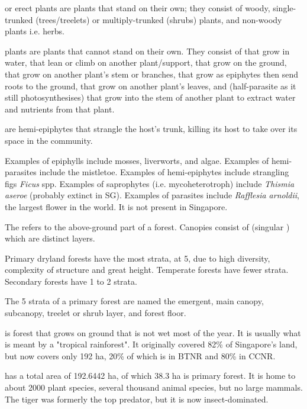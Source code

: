 \documentclass{slnotes}
\newcommand{\scn}[1]{\textit{#1}}
\begin{document}
 or erect plants are plants that stand on their own; they consist of woody, single-trunked (trees/treelets) or multiply-trunked (shrubs) plants, and non-woody plants i.e. herbs.

 plants are plants that cannot stand on their own. They consist of  that grow in water,  that lean or climb on another plant/support,  that grow on the ground,  that grow on another plant's stem or branches,  that grow as epiphytes then send roots to the ground,  that grow on another plant's leaves, and  (half-parasite as it still photosynthesises) that grow into the stem of another plant to extract water and nutrients from that plant.

 are hemi-epiphytes that strangle the host's trunk, killing its host to take over its space in the community.

Examples of epiphylls include mosses, liverworts, and algae. Examples of hemi-parasites include the mistletoe. Examples of hemi-epiphytes include strangling figs \scn{Ficus} spp. Examples of saprophytes (i.e. mycoheterotroph) include \scn{Thismia aseroe} (probably extinct in SG). Examples of parasites include \scn{Rafflesia arnoldii}, the largest flower in the world. It is not present in Singapore.

The  refers to the above-ground part of a forest. Canopies consist of  (singular ) which are distinct layers.

Primary dryland forests have the most strata, at 5, due to high diversity, complexity of structure and great height. Temperate forests have fewer strata. Secondary forests have 1 to 2 strata.

The 5 strata of a primary forest are named the emergent, main canopy, subcanopy, treelet or shrub layer, and forest floor.

 is forest that grows on ground that is not wet most of the year. It is usually what is meant by a "tropical rainforest". It originally covered 82\% of Singapore's land, but now covers only 192 ha, 20\% of which is in BTNR and 80\% in CCNR.

 has a total area of 192.6442 ha, of which 38.3 ha is primary forest. It is home to about 2000 plant species, several thousand animal species, but no large mammals. The tiger was formerly the top predator, but it is now insect-dominated.
\end{document}
